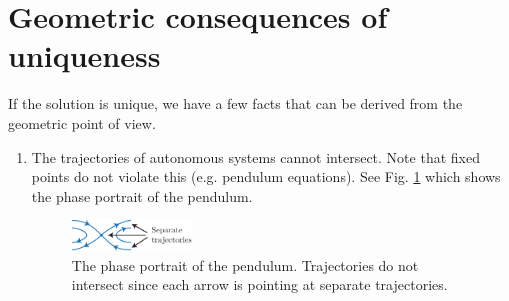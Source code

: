 \section{Geometric consequences of uniqueness}
If the solution is unique, we have a few facts that can be derived from the geometric point of view.
\begin{enumerate}
	\item The trajectories of autonomous systems cannot intersect. Note that fixed points do not violate this (e.g. pendulum equations). See Fig. \ref{fig:pend_phase_portrait} which shows the phase portrait of the pendulum.
		\begin{figure}[h!]
			\centering
			\includegraphics[width=0.3\textwidth]{figures/ch1/3pendulum_trajectories.pdf}
			\caption{The phase portrait of the pendulum. Trajectories do not intersect since each arrow is pointing at separate trajectories.}
			\label{fig:pend_phase_portrait}
		\end{figure}
		

\end{enumerate}
